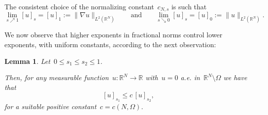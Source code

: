 \documentclass[12pt,a4paper,intlimits,sumlimits]{amsart}
\def \R {\mathbb{R}}
\theoremstyle{definition}
\theoremstyle{plain}
\newtheorem{lemma}[definition]{Lemma}
\numberwithin{equation}{section}
\renewcommand{\le}{\leqslant}
\begin{document}
The consistent choice of the normalizing constant~$c_{N,s}$ is such that
$$ \lim_{s\nearrow1}[u]_{s}=[u]_1:=\|\nabla u\|_{L^2(\R^N)}
\qquad{\mbox{and}}\qquad
\lim_{s\searrow0}[u]_s=[u]_0:=\|u\|_{L^2(\R^N)}.
$$
\medskip

We now observe that higher exponents in fractional norms control lower exponents, with uniform constants, according to the next observation:
 
\begin{lemma}\label{nons}
Let~$0\le s_1 \le s_2 \le1$. 

Then, for any measurable function~$u:\R^N\to\R$ with~$u=0$ a.e. in~$\R^N\setminus\Omega$ we have that
\begin{equation}\label{spp}
[u]_{s_1}\le c \, [u]_{s_2},
\end{equation}
for a suitable positive constant~$c=c(N,\Omega)$.
\end{lemma}
\end{document}
